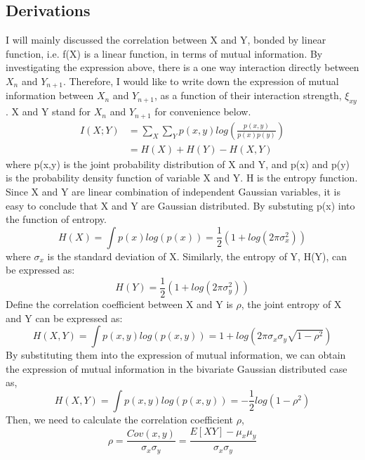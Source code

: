 \documentclass{article}
\begin{document}
		\subsection{Derivations}
		I will mainly discussed the correlation between X and Y, bonded by linear function, i.e. f(X) is a linear function, in terms of mutual information. By investigating the expression above, there is a one way interaction directly between $X_n$ and $Y_{n + 1}$. Therefore, I would like to write down the expression of mutual information between $X_n$ and $Y_{n + 1}$, as a function of their interaction strength, $\xi_{xy}$. X and Y stand for $X_n$ and $Y_{n+1}$ for convenience below.
		\begin{equation}
			\begin{aligned}
				I(X;Y) & = \sum_X\sum_Yp(x,y)log(\frac{p(x,y)}{p(x)p(y)}) \\
				& = H(X) + H(Y) - H(X,Y)
			\end{aligned}
		\end{equation}
		where p(x,y) is the joint probability distribution of X and Y, and p(x) and p(y) is the probability density function of variable X and Y. H is the entropy function. Since X and Y are linear combination of independent Gaussian variables, it is easy to conclude that X and Y are Gaussian distributed. By substuting p(x) into the function of entropy.
		\begin{equation}
			H(X) = \int p(x)log(p(x)) = \frac{1}{2}(1+log(2\pi\sigma_x^2))
		\end{equation}
		where $\sigma_x$ is the standard deviation of X. Similarly, the entropy of Y, H(Y), can be expressed as:
		\begin{equation}
			H(Y) = \frac{1}{2}(1+log(2\pi\sigma_y^2))
		\end{equation}
		Define the correlation coefficient between X and Y is $\rho$, the joint entropy of X and Y can be expressed as:
		\begin{equation}
			H(X,Y) = \int p(x,y)log(p(x,y)) = 1+log(2\pi\sigma_x\sigma_y\sqrt{1-\rho^2})
		\end{equation}
		By substituting them into the expression of mutual information, we can obtain the expression of mutual information in the bivariate Gaussian distributed case as,
		\begin{equation}
			H(X,Y) = \int p(x,y)log(p(x,y)) = -\frac{1}{2}log(1-\rho^2)
		\end{equation}
		Then, we need to calculate the correlation coefficient $\rho$,
		\begin{equation}
			\rho = \frac{Cov(x,y)}{\sigma_x\sigma_y} = \frac{E[XY] - \mu_x\mu_y}{\sigma_x\sigma_y}
		\end{equation}
\end{document}
